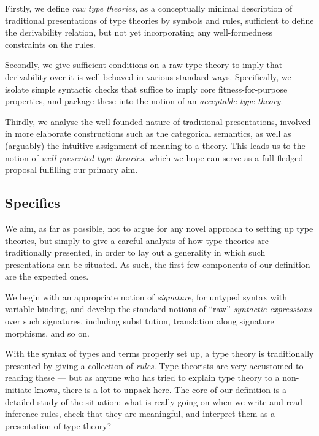   Firstly, we define \emph{raw type theories}, as a conceptually minimal description of traditional presentations of type theories by symbols and rules,
  sufficient to define the derivability relation, but not yet incorporating any well-formedness constraints on the rules.
  
  Secondly, we give sufficient conditions on a raw type theory to imply that derivability over it is well-behaved in various standard ways.
  Specifically, we isolate simple syntactic checks that suffice to imply core fitness-for-purpose properties, and package these into the notion of an \emph{acceptable type theory}.
  
  Thirdly, we analyse the well-founded nature of traditional presentations,
  involved in more elaborate constructions such as the categorical semantics,
  as well as (arguably) the intuitive assignment of meaning to a theory.  %
  This leads us to the notion of \emph{well-presented type theories}, which we hope can serve as a full-fledged proposal fulfilling our primary aim.
  
\subsection{Specifics}

We aim, as far as possible, not to argue for any novel approach to setting up type theories, but simply to give a careful analysis of how type theories are traditionally presented, in order to lay out a generality in which such presentations can be situated.
%
As such, the first few components of our definition are the expected ones.

We begin with an appropriate notion of \emph{signature}, for untyped syntax with variable-binding, and develop the standard notions of ``raw'' \emph{syntactic expressions} over such signatures, including substitution, translation along signature morphisms, and so on.

With the syntax of types and terms properly set up, a type theory is traditionally presented by giving a collection of \emph{rules}.
% 
Type theorists are very accustomed to reading these --- but as anyone who has tried to explain type theory to a non-initiate knows, there is a lot to unpack here.
%
The core of our definition is a detailed study of the situation: what is really going on when we write and read inference rules, check that they are meaningful, and interpret them as a presentation of type theory?

